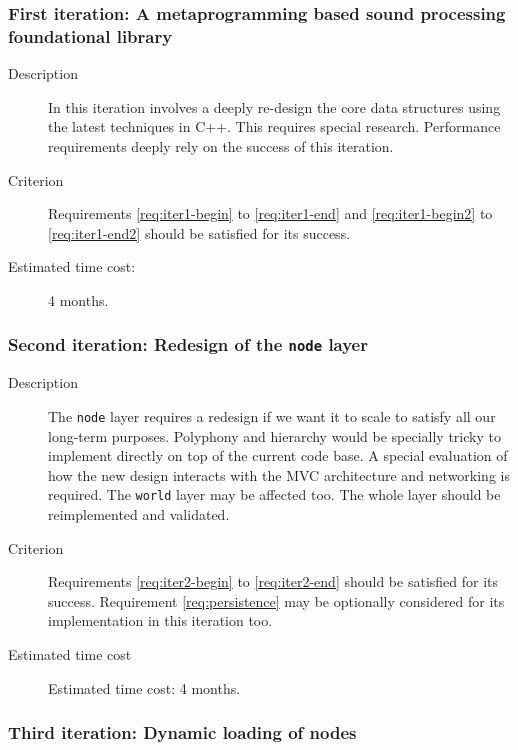 \subsubsection{First iteration: A metaprogramming based sound
  processing foundational library}

\begin{description}
\item[Description] In this iteration involves a deeply re-design the
  core data structures using the latest techniques in C++. This
  requires special research. Performance requirements deeply rely on
  the success of this iteration.

\item[Criterion] Requirements \ref{req:iter1-begin} to
  \ref{req:iter1-end} and \ref{req:iter1-begin2} to
  \ref{req:iter1-end2} should be satisfied for its success.

\item[Estimated time cost:] 4 months.
\end{description}

\subsubsection{Second iteration: Redesign of the \texttt{node} layer}

\begin{description}
\item[Description] The \texttt{node} layer requires a redesign if we
  want it to scale to satisfy all our long-term purposes. Polyphony
  and hierarchy would be specially tricky to implement directly on top
  of the current code base. A special evaluation of how the new design
  interacts with the MVC architecture and networking is required. The
  \texttt{world} layer may be affected too. The whole layer should be
  reimplemented and validated.

\item[Criterion] Requirements \ref{req:iter2-begin} to
  \ref{req:iter2-end} should be satisfied for its success. Requirement
  \ref{req:persistence} may be optionally considered for its
  implementation in this iteration too.

  \item[Estimated time cost] Estimated time cost: 4 months.
\end{description}

\subsubsection{Third iteration: Dynamic loading of nodes}

